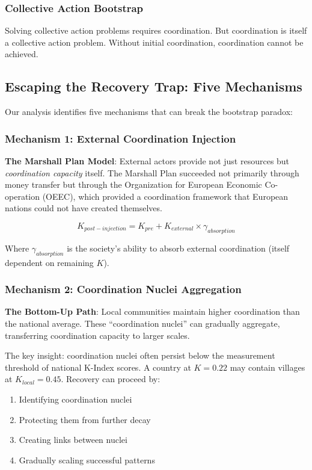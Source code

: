 \documentclass[11pt,letterpaper]{article}
\newcommand{\kindex}{K}
\begin{document}
\subsubsection{Collective Action Bootstrap}
Solving collective action problems requires coordination. But coordination is itself a collective action problem. Without initial coordination, coordination cannot be achieved.

\subsection{Escaping the Recovery Trap: Five Mechanisms}

Our analysis identifies five mechanisms that can break the bootstrap paradox:

\subsubsection{Mechanism 1: External Coordination Injection}
\textbf{The Marshall Plan Model}: External actors provide not just resources but \emph{coordination capacity} itself. The Marshall Plan succeeded not primarily through money transfer but through the Organization for European Economic Co-operation (OEEC), which provided a coordination framework that European nations could not have created themselves.

\begin{equation}
\kindex_{post-injection} = \kindex_{pre} + \kindex_{external} \times \gamma_{absorption}
\label{eq:injection}
\end{equation}

Where $\gamma_{absorption}$ is the society's ability to absorb external coordination (itself dependent on remaining $\kindex$).

\subsubsection{Mechanism 2: Coordination Nuclei Aggregation}
\textbf{The Bottom-Up Path}: Local communities maintain higher coordination than the national average. These ``coordination nuclei'' can gradually aggregate, transferring coordination capacity to larger scales.

The key insight: coordination nuclei often persist below the measurement threshold of national K-Index scores. A country at $\kindex = 0.22$ may contain villages at $\kindex_{local} = 0.45$. Recovery can proceed by:
\begin{enumerate}
\item Identifying coordination nuclei
\item Protecting them from further decay
\item Creating links between nuclei
\item Gradually scaling successful patterns
\end{enumerate}
\end{document}
